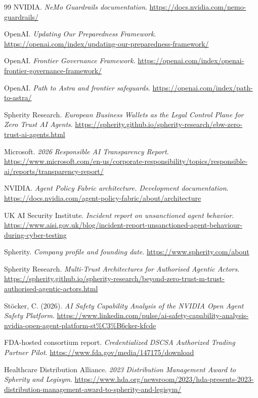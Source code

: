 \begin{thebibliography}{99}
NVIDIA. \textit{NeMo Guardrails documentation}.
\url{https://docs.nvidia.com/nemo-guardrails/}

OpenAI. \textit{Updating Our Preparedness Framework}.
\url{https://openai.com/index/updating-our-preparedness-framework/}

OpenAI. \textit{Frontier Governance Framework}.
\url{https://openai.com/index/openai-frontier-governance-framework/}

OpenAI. \textit{Path to Astra and frontier safeguards}.
\url{https://openai.com/index/path-to-astra/}

Spherity Research. \textit{European Business Wallets as the Legal Control Plane for Zero Trust AI Agents}.
\url{https://spherity.github.io/spherity-research/ebw-zero-trust-ai-agents.html}

Microsoft. \textit{2026 Responsible AI Transparency Report}.
\url{https://www.microsoft.com/en-us/corporate-responsibility/topics/responsible-ai/reports/transparency-report/}

NVIDIA. \textit{Agent Policy Fabric architecture. Development documentation}.
\url{https://docs.nvidia.com/agent-policy-fabric/about/architecture}

UK AI Security Institute. \textit{Incident report on unsanctioned agent behavior}.
\url{https://www.aisi.gov.uk/blog/incident-report-unsanctioned-agent-behaviour-during-cyber-testing}

Spherity. \textit{Company profile and founding date}.
\url{https://www.spherity.com/about}

Spherity Research. \textit{Multi-Trust Architectures for Authorised Agentic Actors}.
\url{https://spherity.github.io/spherity-research/beyond-zero-trust-m-trust-authorised-agentic-actors.html}

Stöcker, C. (2026). \textit{AI Safety Capability Analysis of the NVIDIA Open Agent Safety Platform}.
\url{https://www.linkedin.com/pulse/ai-safety-capability-analysis-nvidia-open-agent-platform-st%C3%B6cker-kfcde}

FDA-hosted consortium report. \textit{Credentialized DSCSA Authorized Trading Partner Pilot}.
\url{https://www.fda.gov/media/147175/download}

Healthcare Distribution Alliance. \textit{2023 Distribution Management Award to Spherity and Legisym}.
\url{https://www.hda.org/newsroom/2023/hda-presents-2023-distribution-management-award-to-spherity-and-legisym/}


\end{thebibliography}
